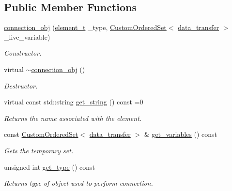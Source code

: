 \subsection*{Public Member Functions}
\begin{DoxyCompactItemize}
\item 
\hyperlink{classconnection__obj_aa47e65d4e7d00196b141a7213b020896}{connection\+\_\+obj} (\hyperlink{classconnection__obj_a28fc8ddc2893b5ef328f75147a18f6c6}{element\+\_\+t} \+\_\+type, \hyperlink{classCustomOrderedSet}{Custom\+Ordered\+Set}$<$ \hyperlink{conn__binding_8hpp_ae44ffa64566f2bb3ce6941833ac940fb}{data\+\_\+transfer} $>$ \+\_\+live\+\_\+variable)
\begin{DoxyCompactList}\small\item\em Constructor. \end{DoxyCompactList}\item 
virtual \hyperlink{classconnection__obj_a044d8d6ac45afa809a74ae788f9fc54b}{$\sim$connection\+\_\+obj} ()
\begin{DoxyCompactList}\small\item\em Destructor. \end{DoxyCompactList}\item 
virtual const std\+::string \hyperlink{classconnection__obj_a9d68f6173578ed258c9a6477b2e4b408}{get\+\_\+string} () const =0
\begin{DoxyCompactList}\small\item\em Returns the name associated with the element. \end{DoxyCompactList}\item 
const \hyperlink{classCustomOrderedSet}{Custom\+Ordered\+Set}$<$ \hyperlink{conn__binding_8hpp_ae44ffa64566f2bb3ce6941833ac940fb}{data\+\_\+transfer} $>$ \& \hyperlink{classconnection__obj_a0fb7f6642b13fe69f3036aaf8781f22b}{get\+\_\+variables} () const
\begin{DoxyCompactList}\small\item\em Gets the temporary set. \end{DoxyCompactList}\item 
unsigned int \hyperlink{classconnection__obj_a4d228e61318777705dcbdb481c5e1dba}{get\+\_\+type} () const
\begin{DoxyCompactList}\small\item\em Returns type of object used to perform connection. \end{DoxyCompactList}\end{DoxyCompactItemize}
